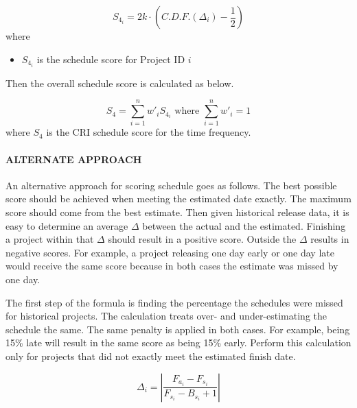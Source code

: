 \documentclass[SDSUThesis.tex]{subfiles}
\begin{document}
                \[
                    S_{4_i} = 2k \cdot (C.D.F.(\Delta_i) - \frac{1}{2})
                \]
                where
                \begin{itemize}
                    \item $S_{4_i}$ is the schedule score for Project ID $i$
                \end{itemize}
                
                Then the overall schedule score is calculated as below.
                
                \[
                    S_{4} = \sum\limits^n_{i=1} w'_i S_{4_i} \text{ where } \sum\limits^n_{i=1} w'_i = 1
                \]
                where $S_4$ is the CRI schedule score for the time frequency.
    
            \paragraph{ALTERNATE APPROACH}
                An alternative approach for scoring schedule goes as follows.
                The best possible score should be achieved
                when meeting the estimated date exactly.  The maximum score
                should come from the best estimate.  Then given historical
                release data, it is easy to determine an 
                average $\Delta$ between the actual and the estimated.  
                Finishing a project within that $\Delta$ should result 
                in a positive score.  Outside the $\Delta$ results in
                negative scores.  For example, a project releasing
                one day early or one day late would receive the same score
                because in both cases the estimate was missed by one day.
                
                The first step of the formula is finding the percentage the schedules were missed for 
                historical projects.  The calculation treats over- and under-estimating the schedule
                the same.  The same penalty is applied in both cases.  For example, being 15\% late
                will result in the same score as being 15\% early. Perform this calculation
                only for projects that did not exactly meet the estimated finish date.
                
                \begin{displaymath}
                    \Delta_i = \left| \frac{F_{a_i} - F_{s_i}}{ F_{s_i} - B_{s_i} + 1} \right|
                \end{displaymath}
                
\end{document}
